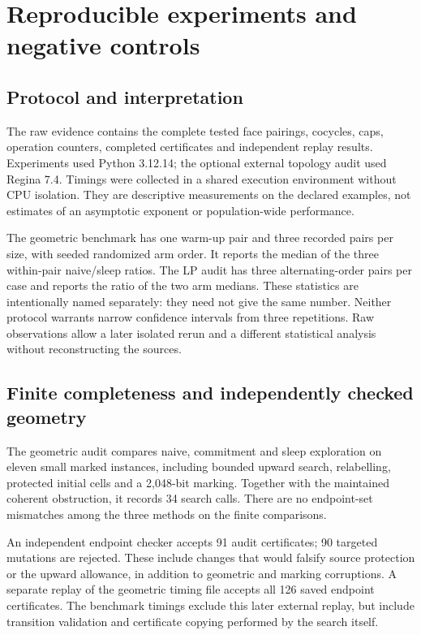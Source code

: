 \section{Reproducible experiments and negative controls}\label{sec:experiments}

\subsection{Protocol and interpretation}

The raw evidence contains the complete tested face pairings, cocycles, caps,
operation counters, completed certificates and independent replay results.
Experiments used Python 3.12.14; the optional external topology audit used
Regina 7.4. Timings were collected in a shared execution environment without
CPU isolation. They are descriptive measurements on the declared examples,
not estimates of an asymptotic exponent or population-wide performance.

The geometric benchmark has one warm-up pair and three recorded pairs per
size, with seeded randomized arm order. It reports the median of the three
within-pair naive/sleep ratios. The LP audit has three alternating-order
pairs per case and reports the ratio of the two arm medians. These statistics
are intentionally named separately: they need not give the same number.
Neither protocol warrants narrow confidence intervals from three repetitions.
Raw observations allow a later isolated rerun and a different statistical
analysis without reconstructing the sources.

\subsection{Finite completeness and independently checked geometry}

The geometric audit compares naive, commitment and sleep exploration on
eleven small marked instances, including bounded upward search, relabelling,
protected initial cells and a 2,048-bit marking. Together with the maintained
coherent obstruction, it records 34 search calls. There are no endpoint-set
mismatches among the three methods on the finite comparisons.

An independent endpoint checker accepts 91 audit certificates; 90 targeted
mutations are rejected. These include changes that would falsify source
protection or the upward allowance, in addition to geometric and marking
corruptions. A separate replay of the geometric timing file accepts all 126
saved endpoint certificates. The benchmark timings exclude this later
external replay, but include transition validation and certificate copying
performed by the search itself.

